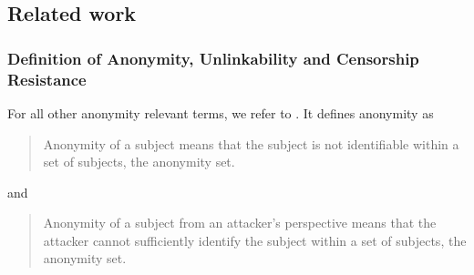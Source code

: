 \documentclass[10pt,journal,compsoc,twocolumn,twoside]{IEEEtran}
\begin{document}
%

\subsection{Related work}
\subsubsection{Definition of Anonymity, Unlinkability and Censorship Resistance}

%
For all other anonymity relevant terms, we refer to \cite{anon_terminology}.
It defines anonymity as 

\begin{quote}
	Anonymity of a subject means that the subject is not identifiable within a set of subjects, the anonymity set.\omitted
\end{quote}
and
\begin{quote}
	Anonymity of a subject from an attacker's perspective means that the attacker cannot sufficiently identify the subject within a set of subjects, the anonymity set.\omitted
\end{quote}
\end{document}
